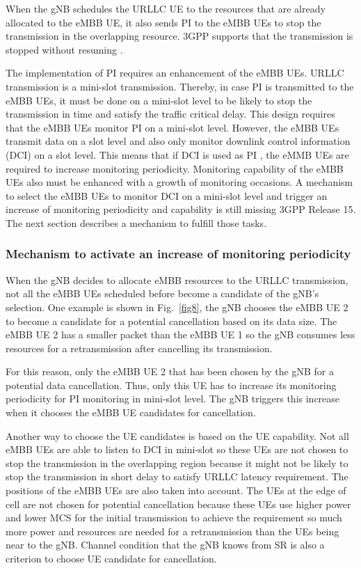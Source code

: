 \documentclass{ieeeaccess}
\begin{document}
When the gNB schedules the URLLC UE to the resources that are already allocated to the eMBB UE, it also sends PI to the eMBB UEs to stop the transmission in the overlapping resource. 3GPP supports that the transmission is stopped without resuming \cite{ref20}. 

The implementation of PI requires an enhancement of the eMBB UEs. URLLC transmission is a mini-slot transmission. Thereby, in case PI is transmitted to the eMBB UEs, it must be done on a mini-slot level to be likely to stop the transmission in time and satisfy the traffic critical delay. This design requires that the eMBB UEs monitor PI on a mini-slot level. However, the eMBB UEs transmit data on a slot level and also only monitor downlink control information (DCI) on a slot level. This means that if DCI is used as PI \cite{ref20}, the eMMB UEs are required to increase monitoring periodicity. Monitoring capability of the eMBB UEs also must be enhanced with a growth of monitoring occasions. A mechanism to select the eMBB UEs to monitor DCI on a mini-slot level and trigger an increase of monitoring periodicity and capability is still missing 3GPP Release 15. The next section describes a mechanism to fulfill those tasks. 

\subsubsection{Mechanism to activate an increase of monitoring periodicity}
When the gNB decides to allocate eMBB resources to the URLLC transmission, not all the eMBB UEs scheduled before become a candidate of the gNB's selection. One example is shown in Fig.~\ref{fig8}, the gNB chooses the eMBB UE 2 to become a candidate for a potential cancellation based on its data size. The eMBB UE 2 has a smaller packet than the eMBB UE 1 so the gNB consumes less resources for a retransmission after cancelling its transmission. 

For this reason, only the eMBB UE 2 that has been chosen by the gNB for a potential data cancellation. Thus, only this UE has to increase its monitoring periodicity for PI monitoring in mini-slot level. The gNB triggers this increase when it chooses the eMBB UE candidates for cancellation.

Another way to choose the UE candidates is based on the UE capability. Not all eMBB UEs are able to listen to DCI in mini-slot so these UEs are not chosen to stop the transmission in the overlapping region because it might not be likely to stop the transmission in short delay to satisfy URLLC latency requirement.
The positions of the eMBB UEs are also taken into account. The UEs at the edge of cell are not chosen for potential cancellation because these UEs use higher power and lower MCS for the initial transmission to achieve the requirement so much more power and resources are needed for a retransmission than the UEs being near to the gNB. Channel condition that the gNB knows from SR is also a criterion to choose UE candidate for cancellation.
\end{document}
